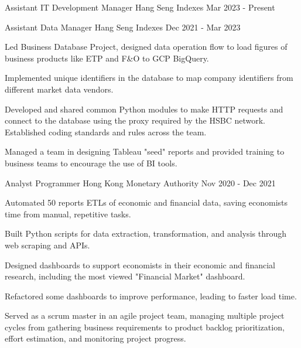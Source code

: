 

\begin{cventries}

  \cventry
    {Assistant IT Development Manager} %
    {Hang Seng Indexes} %
    {Mar 2023 - Present} %
    {} %
    {
    }

  \cventry
    {Assistant Data Manager} %
    {Hang Seng Indexes} %
    {Dec 2021 - Mar 2023} %
    {} %
    {
      \begin{cvitems} %
        \item {Led Business Database Project, designed data operation flow to load figures of business products like ETP and F\&O to GCP BigQuery.}
        \item {Implemented unique identifiers in the database to map company identifiers from different market data vendors.}
        \item {Developed and shared common Python modules to make HTTP requests and connect to the database using the proxy required by the HSBC network. Established coding standards and rules across the team.}
        \item {Managed a team in designing Tableau "seed" reports and provided training to business teams to encourage the use of BI tools.}
      \end{cvitems}
    }

  \cventry
    {Analyst Programmer} %
    {Hong Kong Monetary Authority} %
    {Nov 2020 - Dec 2021} %
    {} %
    {
      \begin{cvitems} %
        \item {Automated 50 reports ETLs of economic and financial data, saving economists time from manual, repetitive tasks.}
        \item {Built Python scripts for data extraction, transformation, and analysis through web scraping and APIs.}
        \item {Designed dashboards to support economists in their economic and financial research, including the most viewed "Financial Market" dashboard.}
        \item {Refactored some dashboards to improve performance, leading to faster load time.}
        \item {Served as a scrum master in an agile project team, managing multiple project cycles from gathering business requirements to product backlog prioritization, effort estimation, and monitoring project progress.}
      \end{cvitems}
    }


\end{cventries}
